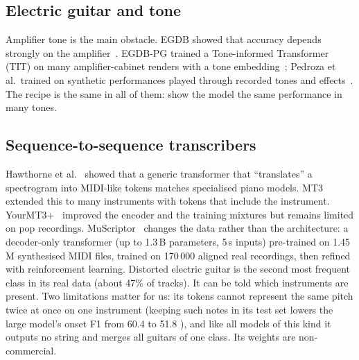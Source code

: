 \subsection{Electric guitar and tone}

Amplifier tone is the main obstacle. EGDB showed that accuracy depends strongly
on the amplifier~\cite{chen2022egdb}. EGDB-PG trained a Tone-informed
Transformer (TIT) on many amplifier-cabinet renders with a tone
embedding~\cite{chen2025egdbpg}; Pedroza et al.\ trained on synthetic
performances played through recorded tones and effects~\cite{pedroza2024tones}.
The recipe is the same in all of them: show the model the same performance in
many tones.

\subsection{Sequence-to-sequence transcribers}
\label{sec:notes-seq2seq}

Hawthorne et al.~\cite{hawthorne2021seq2seq} showed that a generic transformer
that ``translates'' a spectrogram into MIDI-like tokens matches specialised piano
models. MT3~\cite{gardner2022mt3} extended this to many instruments with tokens
that include the instrument. YourMT3+~\cite{chang2024yourmt3} improved the
encoder and the training mixtures but remains limited on pop recordings.
MuScriptor~\cite{rouard2026muscriptor} changes the data rather than the
architecture: a decoder-only transformer (up to 1.3\,B parameters, 5\,s
inputs) pre-trained on 1.45\,M synthesised MIDI files, trained on 170\,000
aligned real recordings, then refined with reinforcement learning. Distorted
electric guitar is the second most frequent class in its real data (about 47\%
of tracks). It can be told which instruments are present. Two limitations
matter for us: its tokens cannot represent the same pitch twice at once on one
instrument (keeping such notes in its test set lowers the large model's onset
F1 from 60.4 to 51.8 \reported), and like all models of this kind it outputs no
string and merges all guitars of one class. Its weights are non-commercial.

